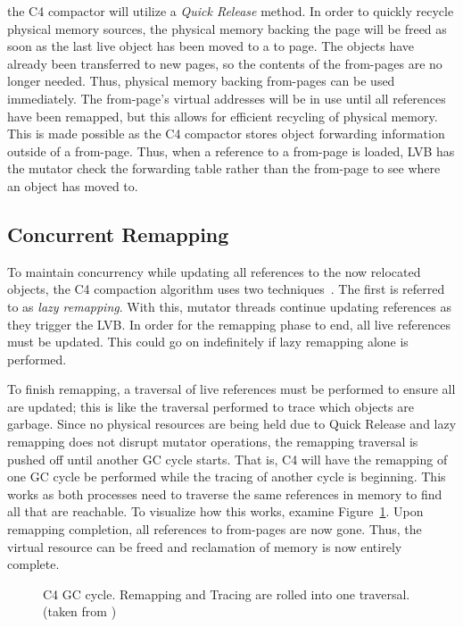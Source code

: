 \documentclass{sig-alternate}
\begin{document}
the C4 compactor will utilize a \emph{Quick Release} method. In order to quickly recycle
physical memory sources, the physical memory backing the page will be freed
as soon as the last live object has been moved to a to page. The objects have already 
been transferred to new pages, so the contents of the from-pages are no longer needed. Thus,
physical memory backing from-pages can be used immediately. The from-page's virtual 
addresses will be in use until all references have been remapped, but this 
allows for efficient recycling of physical memory. This is made possible as the C4 compactor
stores object forwarding information outside of a from-page. Thus, when a reference to
a from-page is loaded, LVB has the mutator check the forwarding table rather than the
from-page to see where an object has moved to.


\subsection{Concurrent Remapping}
\label{sec:c4Remapping}

To maintain concurrency while updating all references to the now relocated
objects, the C4 compaction algorithm uses two techniques~\cite{Tene:C4}. The first is
referred to as \emph{lazy remapping}. With this, mutator
threads continue updating references as they trigger the LVB. In order for
the remapping phase to end, all live references must be updated.
This could go on indefinitely if lazy remapping alone is performed.

To finish remapping, a traversal of live references must be performed to
ensure all are updated; this is like the traversal performed to trace which
objects are garbage. Since no physical resources are being held due
to Quick Release and lazy remapping does not disrupt mutator operations,
the remapping traversal is pushed off until another GC cycle starts. That
is, C4 will have the remapping of one GC cycle be performed while the tracing
of another cycle is beginning. This works as both processes need to traverse
the same references in memory to find all that are reachable. To
visualize how this works, examine Figure~\ref{fig:c4Cycle}. Upon remapping completion, 
all references to from-pages are now gone. Thus, the virtual resource
can be freed and reclamation of memory is now entirely complete. 

\begin{figure}
\centering
{}
\caption{C4 GC cycle. Remapping and Tracing are rolled into one traversal.
(taken from \cite{Tene:C4})}
\label{fig:c4Cycle}
\end{figure}
\end{document}
